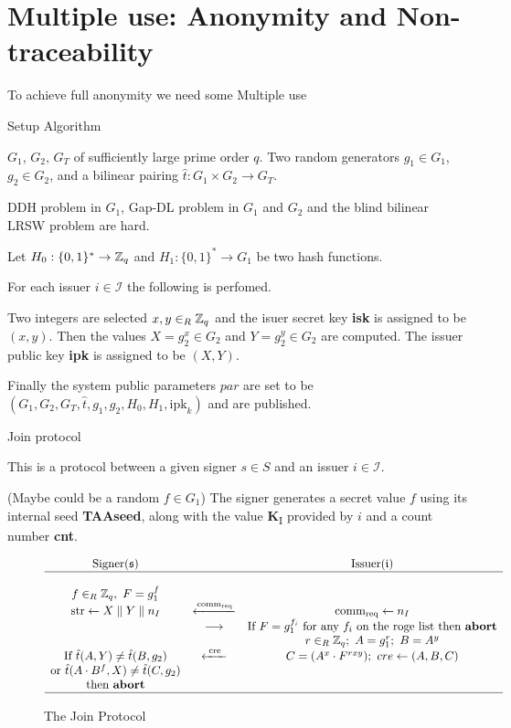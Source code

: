 \chapter{Multiple use: Anonymity and Non-traceability}
To achieve full anonymity we need some 
Multiple use \cite{ChenNW11}
\cite{DazaDSV09}

Setup Algorithm

$G_1$, $G_2$, $G_T$ of sufficiently large prime order $q$. Two random generators $g_1 \in G_1$, $g_2 \in G_2$, and a bilinear pairing $\hat{t}: G_1 \times G_2 \rightarrow G_T$.

DDH problem in $G_1$, Gap-DL problem in $G_1$ and $G_2$ and the blind bilinear LRSW problem are hard.

Let $H_0 : \{0,1\}^\ast \rightarrow {\mathbb Z}_q$ and $H_1 : \{ 0 , 1 \}^\ast \rightarrow G_1$ be two hash functions.

For each issuer $i \in \mathcal{I}$ the following is perfomed.

Two integers are selected $x,y \in_R {\mathbb Z}_q$ and the isuer secret key \textbf{isk} is assigned to be $(x,y)$. Then the values $X = g_2^{x} \in G_2$ and $Y = g_2^{y} \in G_2$ are computed. The issuer public key \textbf{ipk} is assigned to be $(X,Y)$.

Finally the system public parameters $par$ are set to be $(G_1, G_2, G_T, \hat{t}, g_1, g_2, H_0, H_1, \text{ipk
}_k)$ and are published.

Join protocol

This is a protocol between a given signer $s \in S$  and an issuer $i \in \mathcal{I}$.


(Maybe could be a random $f \in G_1$)
The signer generates a secret value $f$ using its internal seed \textbf{TAAseed}, along with the value \textbf{K}\textsubscript{I} provided by $i$ and a count number \textbf{cnt}.

\begin{figure}[H]
$$
\begin{array}{ccc}
    \text{Signer}(\mathfrak{s}) &    & \text{Issuer}(\mathfrak{i}) \\
    \hline
    \\
    f \in_R {\mathbb Z}_q, \ F = g_1^f &    &    \\
    \text{str} \leftarrow X \parallel Y \parallel n_I &  \xleftarrow{\text{comm}_{\text{req}}} & \text{comm}_{\text{req}} \leftarrow n_I \\
        & \longrightarrow & \text{If } F = g_1^{f_i} \text{ for any } f_i \text{ on the roge list then \textbf{abort}} \\
        &        & r\in_R {\mathbb Z}_q; \ A = g_1^r; \ B = A^y \\
    \text{If } \hat{t}(A,Y) \neq \hat{t}(B,g_2) & \xleftarrow{\text{  cre  }} & C = (A^x \cdot F^{rxy}); \ cre \leftarrow(A,B,C) \\
    \text{or } \hat{t}(A \cdot B^f , X) \neq \hat{t}(C,g_2) &    & \\
    \text{then \textbf{abort}} &    & \\
    \hline
\end{array} 
$$
\caption{The Join Protocol}
\label{fig:join}
\end{figure}

